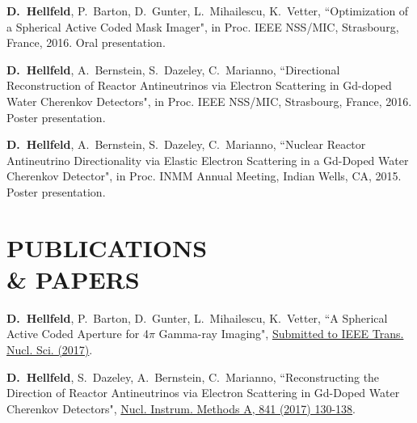 \documentclass[margin, 10pt]{style/res} %
\begin{document}
\begin{resume}
 \begin{thebibliography}{3}
 \raggedright
 \vspace{10pt}

 
  \textbf{D.~Hellfeld}, P.~Barton, D.~Gunter, L.~Mihailescu, K.~Vetter, ``Optimization of a Spherical Active Coded Mask Imager", in Proc. IEEE NSS/MIC, Strasbourg, France, 2016. Oral presentation.
 
  \textbf{D.~Hellfeld}, A.~Bernstein, S.~Dazeley, C.~Marianno, ``Directional Reconstruction of Reactor Antineutrinos via Electron Scattering in Gd-doped Water Cherenkov Detectors", in Proc. IEEE NSS/MIC, Strasbourg, France, 2016. Poster presentation.
 
  \textbf{D.~Hellfeld}, A.~Bernstein, S.~Dazeley, C.~Marianno, ``Nuclear Reactor Antineutrino Directionality via Elastic Electron Scattering in a Gd-Doped Water Cherenkov Detector", in Proc. INMM Annual Meeting, Indian Wells, CA, 2015. Poster presentation.

 \end{thebibliography}





\section{\small{PUBLICATIONS \\\& PAPERS}}

\begin{thebibliography}{3}
 \raggedright
\vspace{10pt}

 \textbf{D.~Hellfeld}, P.~Barton, D.~Gunter, L.~Mihailescu, K.~Vetter, ``A Spherical Active Coded Aperture for 4$\pi$ Gamma-ray Imaging", \href{http://www.google.com}{Submitted to IEEE Trans. Nucl. Sci. (2017)}.
 
 \textbf{D.~Hellfeld}, S.~Dazeley, A.~Bernstein, C.~Marianno, ``Reconstructing the Direction of Reactor Antineutrinos via Electron Scattering in Gd-Doped Water Cherenkov Detectors", \href{http://www.sciencedirect.com/science/article/pii/S0168900216310555}{Nucl. Instrum. Methods A, 841 (2017) 130-138}.


\end{thebibliography}
\end{resume}
\end{document}
